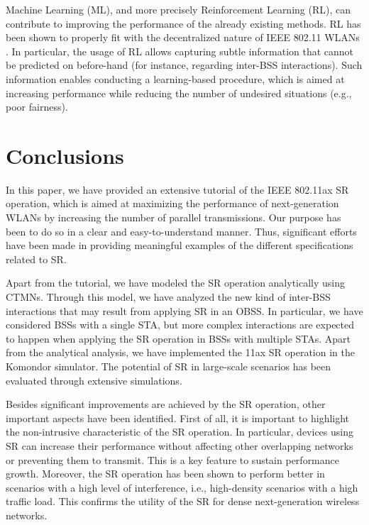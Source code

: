 \documentclass{ieeeaccess}
\begin{document}
Machine Learning (ML), and more precisely Reinforcement Learning (RL), can contribute to improving the performance of the already existing methods. RL has been shown to properly fit with the decentralized nature of IEEE 802.11 WLANs \cite{wilhelmi2019collaborative, wilhelmi2019potential}. In particular, the usage of RL allows capturing subtle information that cannot be predicted on before-hand (for instance, regarding inter-BSS interactions). Such information enables conducting a learning-based procedure, which is aimed at increasing performance while reducing the number of undesired situations (e.g., poor fairness).

\section{Conclusions}
\label{section:conclusions}
In this paper, we have provided an extensive tutorial of the IEEE 802.11ax SR operation, which is aimed at maximizing the performance of next-generation WLANs by increasing the number of parallel transmissions. Our purpose has been to do so in a clear and easy-to-understand manner. Thus, significant efforts have been made in providing meaningful examples of the different specifications related to SR. %

Apart from the tutorial, we have modeled the SR operation analytically using CTMNs. Through this model, we have analyzed the new kind of inter-BSS interactions that may result from applying SR in an OBSS. In particular, we have considered BSSs with a single STA, but more complex interactions are expected to happen when applying the SR operation in BSSs with multiple STAs. Apart from the analytical analysis, we have implemented the 11ax SR operation in the Komondor simulator. The potential of SR in large-scale scenarios has been evaluated through extensive simulations.

Besides significant improvements are achieved by the SR operation, other important aspects have been identified. First of all, it is important to highlight the non-intrusive characteristic of the SR operation. In particular, devices using SR can increase their performance without affecting other overlapping networks or preventing them to transmit. This is a key feature to sustain performance growth. Moreover, the SR operation has been shown to perform better in scenarios with a high level of interference, i.e., high-density scenarios with a high traffic load. This confirms the utility of the SR for dense next-generation wireless networks.
\end{document}
